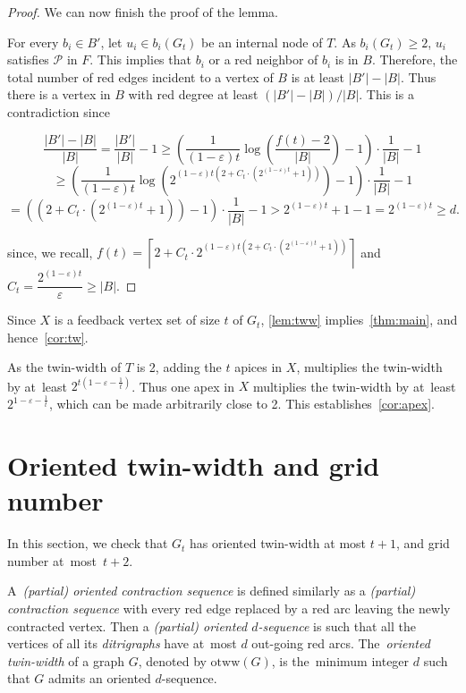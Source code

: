 \documentclass[a4paper,UKenglish,cleveref,hyperref,autoref]{lipics-v2021}
\renewcommand{\geq}{\geqslant}
\newcommand{\otww}{\text{otww}}
\newcommand\abs[1]{\lvert #1\rvert}
\begin{document}
\begin{proof}
We can now finish the proof of the lemma.

  For every $b_i \in B'$, let $u_i \in b_i(G_t)$ be an internal node of $T$.
  As $b_i(G_t) \geq 2$, $u_i$ satisfies $\mathscr P$ in $F$.
  This implies that $b_i$ or a red neighbor of $b_i$ is in $B$.
  Therefore, the total number of red edges incident to a vertex of $B$ is at least $|B'|-|B|$.
  Thus there is a vertex in $B$ with red degree at least $(|B'|-|B|)/|B|$.
  This is a contradiction since

    $$\frac{|B'|-|B|}{|B|} = \frac{|B'|}{|B|}-1 \geq \left(\frac{1}{(1-\varepsilon) t} \log\left(\frac{f(t)-2}{\abs{B}}\right)-1\right) \cdot \frac{1}{|B|}-1 $$
  $$ \geq \left(\frac{1}{(1-\varepsilon) t} \log\left(2^{(1-\varepsilon) t(2+C_t \cdot (2^{(1-\varepsilon) t}+1))}\right)-1\right) \cdot \frac{1}{|B|}-1 $$
  $$ = \left((2+C_t \cdot (2^{(1-\varepsilon) t}+1)) -1\right) \cdot \frac{1}{|B|}-1 > 2^{(1-\varepsilon) t}+1 - 1 = 2^{(1-\varepsilon) t} \geq d.$$
    
    since, we recall, $f(t)=\left\lceil2+C_t \cdot 2^{(1-\varepsilon) t(2+C_t \cdot (2^{(1-\varepsilon) t}+1))}\right\rceil$ and $C_t = \dfrac{2^{(1-\varepsilon) t}}{\varepsilon} \geq |B|$.
\end{proof}

Since $X$ is a feedback vertex set of size $t$ of $G_t$, \cref{lem:tww} implies~\cref{thm:main}, and hence~\cref{cor:tw}.


As the twin-width of $T$ is 2, adding the $t$ apices in $X$, multiplies the twin-width by at~least $2^{t(1-\varepsilon-\frac{1}{t})}$.
Thus one apex in $X$ multiplies the twin-width by at~least $2^{1-\varepsilon-\frac{1}{t}}$, which can be made arbitrarily close to 2.
This establishes~\cref{cor:apex}.

\section{Oriented twin-width and grid number}

In this section, we check that $G_t$ has oriented twin-width at most $t+1$, and grid number at~most~$t+2$.

A~\emph{(partial) oriented contraction sequence} is defined similarly as a \emph{(partial) contraction sequence} with every red edge replaced by a red arc leaving the newly contracted vertex.
Then a \emph{(partial) oriented $d$-sequence} is such that all the vertices of all its \emph{ditrigraphs} have at~most $d$ out-going red arcs.
The~\emph{oriented twin-width} of a graph $G$, denoted by $\otww(G)$, is the~minimum integer $d$ such that $G$ admits an oriented $d$-sequence.
\end{document}

